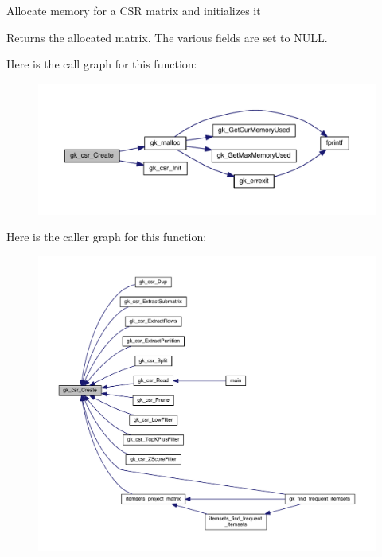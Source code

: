 Allocate memory for a C\+SR matrix and initializes it \begin{DoxyReturn}{Returns}
the allocated matrix. The various fields are set to N\+U\+LL. 
\end{DoxyReturn}
Here is the call graph for this function\+:\nopagebreak
\begin{figure}[H]
\begin{center}
\leavevmode
\includegraphics[width=350pt]{a00023_a82b885bbed5bd18c26629c35ce5d37e4_cgraph}
\end{center}
\end{figure}
Here is the caller graph for this function\+:\nopagebreak
\begin{figure}[H]
\begin{center}
\leavevmode
\includegraphics[width=350pt]{a00023_a82b885bbed5bd18c26629c35ce5d37e4_icgraph}
\end{center}
\end{figure}
\mbox{\label{a00023_a8bdd383ab80fe76507463f59c3d2863a}} 

